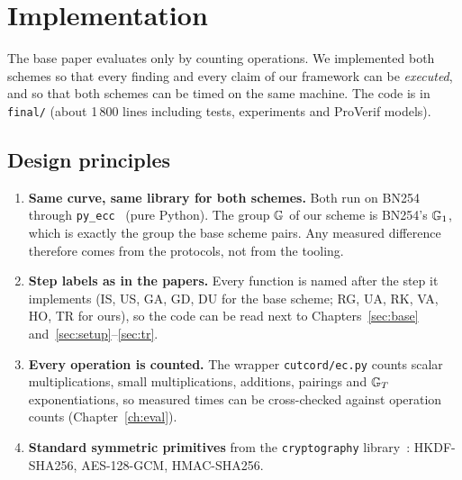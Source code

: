 \chapter{Implementation}\label{ch:impl}
The base paper evaluates only by counting operations. We implemented both schemes so that every finding and every claim of our framework can be
\emph{executed}, and so that both schemes can be timed on the same machine. The code is in \texttt{final/} (about 1\,800 lines including tests, experiments and
ProVerif models).

\section{Design principles}
\begin{enumerate}[label=\textbf{P\arabic*.}]
  \item \textbf{Same curve, same library for both schemes.} Both run on BN254 through \texttt{py\_ecc}~\cite{pyecc} (pure Python). The group $\mathbb{G}$ of our scheme is
        BN254's $\mathbb{G}_1$, which is exactly the group the base scheme pairs. Any measured difference therefore comes from the protocols, not from the tooling.
  \item \textbf{Step labels as in the papers.} Every function is named after the step it implements (IS, US, GA, GD, DU for the base scheme; RG, UA, RK, VA, HO, TR
        for ours), so the code can be read next to Chapters~\ref{sec:base} and~\ref{sec:setup}--\ref{sec:tr}.
  \item \textbf{Every operation is counted.} The wrapper \texttt{cutcord/ec.py} counts scalar multiplications, small multiplications, additions,
        pairings and $\mathbb{G}_T$ exponentiations, so measured times can be cross-checked against operation counts (Chapter~\ref{ch:eval}).
  \item \textbf{Standard symmetric primitives} from the \texttt{cryptography} library~\cite{pyca}: HKDF-SHA256, AES-128-GCM, HMAC-SHA256.
\end{enumerate}

